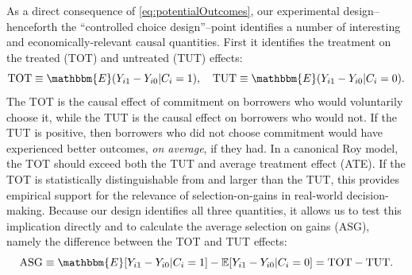 \documentclass[12pt, a4paper]{article}
\begin{document}
As a direct consequence of \eqref{eq:potentialOutcomes}, our experimental design--henceforth the ``controlled choice design''--point identifies a number of interesting and economically-relevant causal quantities. 
First it identifies the treatment on the treated (TOT) and untreated (TUT) effects:  
\[
\text{TOT} \equiv \mathbbm{E}(Y_{i1} - Y_{i0} | C_i = 1), \quad
\text{TUT} \equiv \mathbbm{E}(Y_{i1} - Y_{i0} | C_i = 0).
\]
The TOT is the causal effect of commitment on borrowers who would voluntarily choose it, while the TUT is the causal effect on borrowers who would not.
If the TUT is positive, then borrowers who did not choose commitment would have experienced better outcomes, \emph{on average}, if they had. 
In a canonical Roy model, the TOT should exceed both the TUT and average treatment effect (ATE).
If the TOT is statistically distinguishable from and larger than the TUT, this provides empirical support for the relevance of selection-on-gains in real-world decision-making.
Because our design identifies all three quantities, it allows us to test this implication directly and to calculate the average selection on gains (ASG), namely the difference between the TOT and TUT effects:
\[
\text{ASG} \equiv \mathbbm{E}[Y_{i1} - Y_{i0}|C_i = 1] - \mathbb{E}[Y_{i1} - Y_{i0} | C_i = 0] = \text{TOT} - \text{TUT}.
\]
\end{document}
